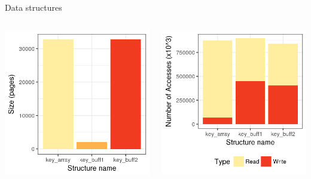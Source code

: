 \documentclass[xcolor={usenames,dvipsnames},hyperref={pdfusetitle}]{beamer}
\begin{document}
\begin{frame}{Data structures}
    \begin{columns}
        \begin{column}{.45\linewidth}
            \centering
            \includegraphics[width=\linewidth]{tabarnac/is_b_structs_sz.png}
        \end{column}
        \begin{column}{.45\linewidth}
            \centering
            \includegraphics[width=\linewidth]{tabarnac/is_b_structs_rw.png}
        \end{column}
    \end{columns}
\end{frame}
\end{document}
